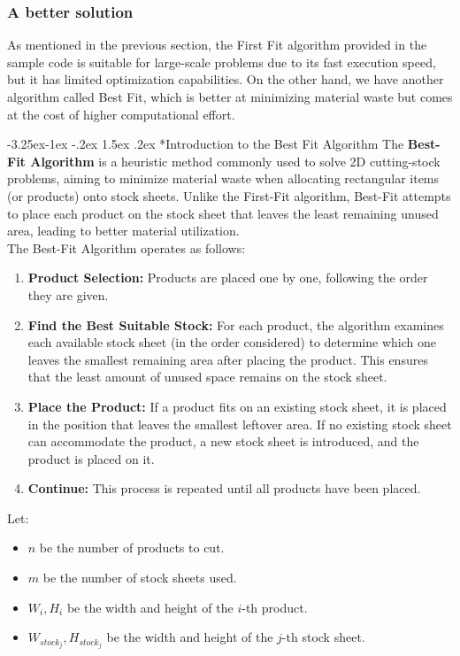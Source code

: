 \documentclass[a4paper]{article}
\makeatletter
\newcounter {subsubsubsection}[subsubsection]
\newcommand\subsubsubsection{\@startsection{subsubsubsection}{4}{\z@}%
                                         {-3.25ex\@plus -1ex \@minus -.2ex}%
                                         {1.5ex \@plus .2ex}%
                                         {\normalfont\normalsize\bfseries}}
\makeatother
\begin{document}
    \subsubsection{A better solution}
    As mentioned in the previous section, the First Fit algorithm provided in the sample code is suitable for large-scale problems due to its fast execution speed, but it has limited optimization capabilities. On the other hand, we have another algorithm called Best Fit, which is better at minimizing material waste but comes at the cost of higher computational effort.
    
    \subsubsubsection*{Introduction to the Best Fit Algorithm}
    The \textbf{Best-Fit Algorithm} is a heuristic method commonly used to solve 2D cutting-stock problems, aiming to minimize material waste when allocating rectangular items (or products) onto stock sheets. Unlike the First-Fit algorithm, Best-Fit attempts to place each product on the stock sheet that leaves the least remaining unused area, leading to better material utilization.
    \vspace{0.2cm}\\
    The Best-Fit Algorithm operates as follows:
    \label{sec:best-fit}
    \begin{enumerate}
        \item \textbf{Product Selection:} Products are placed one by one, following the order they are given.
        \item \textbf{Find the Best Suitable Stock:} For each product, the algorithm examines each available stock sheet (in the order considered) to determine which one leaves the smallest remaining area after placing the product. This ensures that the least amount of unused space remains on the stock sheet.
        \item \textbf{Place the Product:} If a product fits on an existing stock sheet, it is placed in the position that leaves the smallest leftover area. If no existing stock sheet can accommodate the product, a new stock sheet is introduced, and the product is placed on it.
        \item \textbf{Continue:} This process is repeated until all products have been placed.
    \end{enumerate}
    \vspace{0.2cm}
    Let:
    \begin{itemize}
        \item $n$ be the number of products to cut.
        \item $m$ be the number of stock sheets used.
        \item $W_i, H_i$ be the width and height of the $i$-th product.
        \item $W_{stock_j}, H_{stock_j}$ be the width and height of the $j$-th stock sheet.
    \end{itemize}
\end{document}
